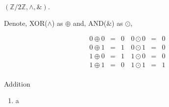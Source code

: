 \documentclass[a4paper,12pt]{article}
\begin{document}
$(\mathbb{Z}/2\mathbb{Z} ,\wedge , \&)$.

Denote, XOR($\wedge$) as $\oplus$ and, AND($\&$) as $\odot$,

\begin{equation}
    \begin{matrix}
        0 \oplus 0 & = &0\\
        0 \oplus 1 & = &1\\
        1 \oplus 0 & = &1\\
        1 \oplus 1 & = &0\\
    \end{matrix}
    \, 
    \begin{matrix}
        0 \odot 0 & = &0\\
        0 \odot 1 & = &0\\
        1 \odot 0 & = &0\\
        1 \odot 1 & = &1\\
    \end{matrix}
\end{equation}

Addition 

\begin{enumerate}
    \item a
\end{enumerate}

  
  
\end{document}

